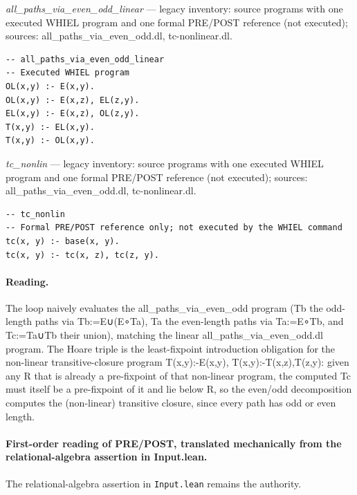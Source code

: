 \documentclass[10pt]{article}
\begin{document}
{\raggedright\textit{all\_paths\_via\_even\_odd\_linear} --- legacy inventory: source programs with one executed WHIEL program and one formal PRE/POST reference (not executed); sources: all\_paths\_via\_even\_odd.dl, tc-nonlinear.dl.\par}

\begin{Verbatim}[fontsize=\scriptsize,breaklines=true,breakanywhere=true,frame=single,framesep=1.5mm]
-- all_paths_via_even_odd_linear
-- Executed WHIEL program
OL(x,y) :- E(x,y).
OL(x,y) :- E(x,z), EL(z,y).
EL(x,y) :- E(x,z), OL(z,y).
T(x,y) :- EL(x,y).
T(x,y) :- OL(x,y).
\end{Verbatim}

{\raggedright\textit{tc\_nonlin} --- legacy inventory: source programs with one executed WHIEL program and one formal PRE/POST reference (not executed); sources: all\_paths\_via\_even\_odd.dl, tc-nonlinear.dl.\par}

\begin{Verbatim}[fontsize=\scriptsize,breaklines=true,breakanywhere=true,frame=single,framesep=1.5mm]
-- tc_nonlin
-- Formal PRE/POST reference only; not executed by the WHIEL command
tc(x, y) :- base(x, y).
tc(x, y) :- tc(x, z), tc(z, y).
\end{Verbatim}

\paragraph{Reading.} The loop naively evaluates the all\_paths\_via\_even\_odd program (Tb the odd-length paths via Tb:=E∪(E∘Ta), Ta the even-length paths via Ta:=E∘Tb, and Tc:=Ta∪Tb their union), matching the linear all\_paths\_via\_even\_odd.dl program. The Hoare triple is the least-fixpoint introduction obligation for the non-linear transitive-closure program T(x,y):-E(x,y), T(x,y):-T(x,z),T(z,y): given any R that is already a pre-fixpoint of that non-linear program, the computed Tc must itself be a pre-fixpoint of it and lie below R, so the even/odd decomposition computes the (non-linear) transitive closure, since every path has odd or even length.

\paragraph{First-order reading of PRE/POST, translated mechanically from the relational-algebra assertion in Input.lean.} The relational-algebra assertion in \texttt{Input.lean} remains the authority.
\end{document}
